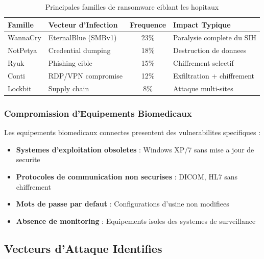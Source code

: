 \begin{table}[H]
    \centering
    \caption{Principales familles de ransomware ciblant les hopitaux}
    \begin{tabular}{|l|l|c|l|}
        \hline
        \textbf{Famille} & \textbf{Vecteur d'Infection} & \textbf{Frequence} & \textbf{Impact Typique}    \\
        \hline
        WannaCry         & EternalBlue (SMBv1)          & 23\%               & Paralysie complete du SIH  \\
        \hline
        NotPetya         & Credential dumping           & 18\%               & Destruction de donnees     \\
        \hline
        Ryuk             & Phishing cible               & 15\%               & Chiffrement selectif       \\
        \hline
        Conti            & RDP/VPN compromise           & 12\%               & Exfiltration + chiffrement \\
        \hline
        Lockbit          & Supply chain                 & 8\%                & Attaque multi-sites        \\
        \hline
    \end{tabular}
\end{table}

\subsubsection{Compromission d'Equipements Biomedicaux}

Les equipements biomedicaux connectes presentent des vulnerabilites specifiques :

\begin{itemize}
    \item \textbf{Systemes d'exploitation obsoletes} : Windows XP/7 sans mise a jour de securite
    \item \textbf{Protocoles de communication non securises} : DICOM, HL7 sans chiffrement
    \item \textbf{Mots de passe par defaut} : Configurations d'usine non modifiees
    \item \textbf{Absence de monitoring} : Equipements isoles des systemes de surveillance
\end{itemize}

\subsection{Vecteurs d'Attaque Identifies}

